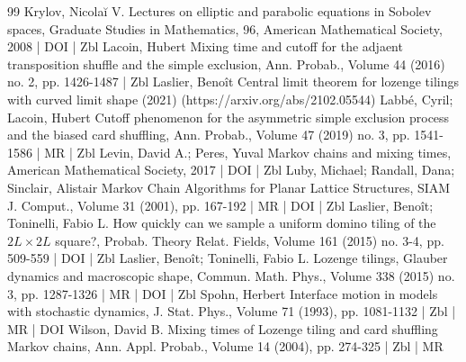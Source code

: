 \begin{thebibliography}{99}
Krylov, Nicolaĭ V. Lectures on elliptic and parabolic equations in Sobolev spaces, Graduate Studies in Mathematics, 96, American Mathematical Society, 2008 | DOI | Zbl
Lacoin, Hubert Mixing time and cutoff for the adjaent transposition shuffle and the simple exclusion, Ann. Probab., Volume 44 (2016) no. 2, pp. 1426-1487 | Zbl
Laslier, Benoît Central limit theorem for lozenge tilings with curved limit shape (2021) (https://arxiv.org/abs/2102.05544)
Labbé, Cyril; Lacoin, Hubert Cutoff phenomenon for the asymmetric simple exclusion process and the biased card shuffling, Ann. Probab., Volume 47 (2019) no. 3, pp. 1541-1586 | MR | Zbl
Levin, David A.; Peres, Yuval Markov chains and mixing times, American Mathematical Society, 2017 | DOI | Zbl
Luby, Michael; Randall, Dana; Sinclair, Alistair Markov Chain Algorithms for Planar Lattice Structures, SIAM J. Comput., Volume 31 (2001), pp. 167-192 | MR | DOI | Zbl
Laslier, Benoît; Toninelli, Fabio L. How quickly can we sample a uniform domino tiling of the $2{L} \times 2{L} $ square?, Probab. Theory Relat. Fields, Volume 161 (2015) no. 3-4, pp. 509-559 | DOI | Zbl
Laslier, Benoît; Toninelli, Fabio L. Lozenge tilings, Glauber dynamics and macroscopic shape, Commun. Math. Phys., Volume 338 (2015) no. 3, pp. 1287-1326 | MR | DOI | Zbl
Spohn, Herbert Interface motion in models with stochastic dynamics, J. Stat. Phys., Volume 71 (1993), pp. 1081-1132 | Zbl | MR | DOI
Wilson, David B. Mixing times of Lozenge tiling and card shuffling Markov chains, Ann. Appl. Probab., Volume 14 (2004), pp. 274-325 | Zbl | MR
\end{thebibliography}
